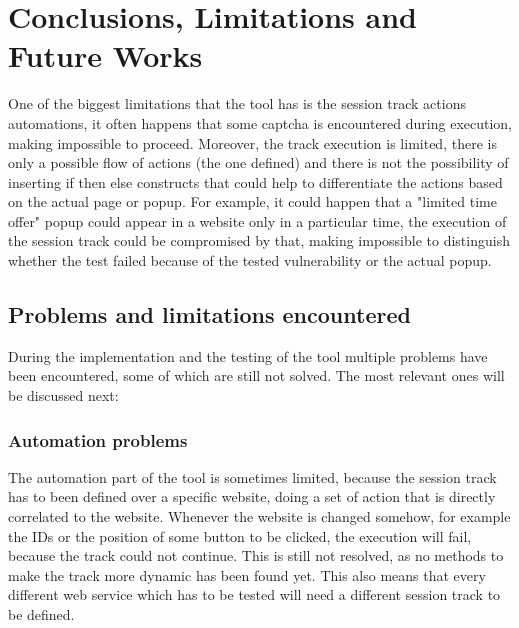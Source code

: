 \chapter{Conclusions, Limitations and Future Works}
One of the biggest limitations that the tool has is the session track actions automations, it often happens that some captcha is encountered during execution, making impossible to proceed. Moreover, the track execution is limited, there is only a possible flow of actions (the one defined) and there is not the possibility of inserting if then else constructs that could help to differentiate the actions based on the actual page or popup. For example, it could happen that a "limited time offer" popup could appear in a website only in a particular time, the execution of the session track could be compromised by that, making impossible to distinguish whether the test failed because of the tested vulnerability or the actual popup.

\section{Problems and limitations encountered}
During the implementation and the testing of the tool multiple problems have been encountered, some of which are still not solved. The most relevant ones will be discussed next:

\subsection{Automation problems}
The automation part of the tool is sometimes limited, because the session track has to been defined over a specific website, doing a set of action that is directly correlated to the website. Whenever the website is changed somehow, for example the IDs or the position of some button to be clicked, the execution will fail, because the track could not continue.
This is still not resolved, as no methods to make the track more dynamic has been found yet. This also means that every different web service which has to be tested will need a different session track to be defined.



